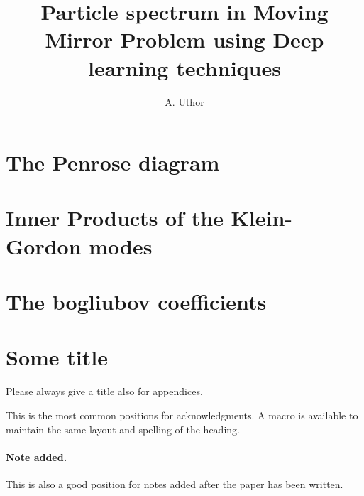 \documentclass[a4paper,11pt]{article}
\title{\boldmath Particle spectrum in Moving Mirror Problem using Deep learning techniques}
\author{A. Uthor}
\affiliation{One University,\\
some-street, Country}
\affiliation{Another University,\\
different-address, Country}
\begin{document}
\maketitle
\flushbottom
% 


\appendix

\section{The Penrose diagram}\label{app:PenDiag}


\section{Inner Products of the Klein-Gordon modes}\label{app:IPmode}


\section{The bogliubov coefficients}
\label{app:b_coeff}
\section{Some title}
Please always give a title also for appendices.





\acknowledgments

This is the most common positions for acknowledgments. A macro is
available to maintain the same layout and spelling of the heading.

\paragraph{Note added.} This is also a good position for notes added
after the paper has been written.











\end{document}
